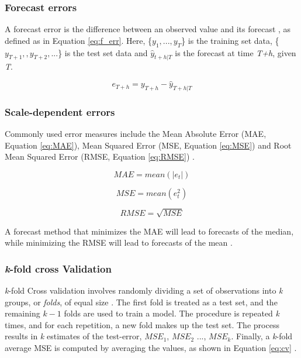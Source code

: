 \subsubsection{Forecast errors}
A forecast error is the difference between an observed value and its forecast \citep{Hyndman}, as defined as in Equation \ref{eq:f_err}. Here, \{$ y_{1},...,y_{T} $\} is the training set data, \{$ y_{T+1},,y_{T+2},...$\} is the test set data and $\hat{y}_{t+h|T}$ is the forecast at time \textit{T+h}, given \textit{T}. 

\begin{equation}\label{eq:f_err}
    e_{T+h} = y_{T+h} - \hat{y}_{T+h|T}
\end{equation}

\subsubsection{Scale-dependent errors}

Commonly used error measures include the Mean Absolute Error (MAE, Equation \ref{eq:MAE}), Mean Squared Error (MSE, Equation \ref{eq:MSE}) and Root Mean Squared Error (RMSE, Equation \ref{eq:RMSE}) \citep{Hyndman}.

\begin{equation}\label{eq:MAE}
    MAE = mean(|e_t|)
\end{equation}

\begin{equation}\label{eq:MSE}
    MSE = mean(e_t^2)
\end{equation}

\begin{equation}\label{eq:RMSE}
    RMSE = \sqrt{MSE}
\end{equation}


A forecast method that minimizes the MAE will lead to forecasts of the median, while minimizing the RMSE will lead to forecasts of the mean \citep{Hyndman}. 

\subsubsection{\textit{k}-fold cross Validation}
\textit{k}-fold Cross validation involves randomly dividing a set of observations into \textit{k} groups, or \textit{folds}, of equal size \citep{ISLR}. The first fold is treated as a test set, and the remaining $k-1$ folds are used to train a model. The procedure is repeated \textit{k} times, and for each repetition, a new fold makes up the test set. The process results in \textit{k} estimates of the test-error, $MSE_1$, $MSE_2$ ..., $MSE_k$. Finally, a \textit{k}-fold average MSE is computed by averaging the values, as shown in Equation \ref{eq:cv} \citep{ISLR}.

